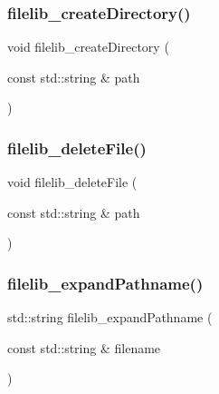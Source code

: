 \mbox{\label{namespaceplatform_aa30655cd42c277a7c5ed7aba21cf0050}} 
\subsubsection{\texorpdfstring{filelib\+\_\+create\+Directory()}{filelib\_createDirectory()}}
{\footnotesize\ttfamily void filelib\+\_\+create\+Directory (\begin{DoxyParamCaption}\item[{const std\+::string \&}]{path }\end{DoxyParamCaption})}

\mbox{\label{namespaceplatform_a50db655854102498e7bbc1d5f409a29f}} 
\subsubsection{\texorpdfstring{filelib\+\_\+delete\+File()}{filelib\_deleteFile()}}
{\footnotesize\ttfamily void filelib\+\_\+delete\+File (\begin{DoxyParamCaption}\item[{const std\+::string \&}]{path }\end{DoxyParamCaption})}

\mbox{\label{namespaceplatform_a7aec69b6d9120eefca74eeba8f7eb02d}} 
\subsubsection{\texorpdfstring{filelib\+\_\+expand\+Pathname()}{filelib\_expandPathname()}}
{\footnotesize\ttfamily std\+::string filelib\+\_\+expand\+Pathname (\begin{DoxyParamCaption}\item[{const std\+::string \&}]{filename }\end{DoxyParamCaption})}

